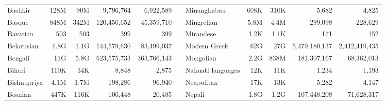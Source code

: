 \begin{table*}[t!]
{\begin{tabular}{@{}lrrrrclrrrr@{}}
            Bashkir                   & 128M                     & 90M                       & 9,796,764                & 6,922,589                 &                          & Minangkabau               & 608K                     & 310K                      & 5,682                    & 4,825                     \\
            Basque                    & 848M                     & 342M                      & 120,456,652              & 45,359,710                &                          & Mingrelian                & 5.8M                     & 4.4M                      & 299,098                  & 228,629                   \\
            Bavarian                  & 503                      & 503                       & 399                      & 399                       &                          & Mirandese                 & 1.2K                     & 1.1K                      & 171                      & 152                       \\
            Belarusian                & 1.8G                     & 1.1G                      & 144,579,630              & 83,499,037                &                          & Modern Greek              & 62G                      & 27G                       & 5,479,180,137            & 2,412,419,435             \\
            Bengali                   & 11G                      & 5.8G                      & 623,575,733              & 363,766,143               &                          & Mongolian                 & 2.2G                     & 838M                      & 181,307,167              & 68,362,013                \\
            Bihari                    & 110K                     & 34K                       & 8,848                    & 2,875                     &                          & Nahuatl languages         & 12K                      & 11K                       & 1,234                    & 1,193                     \\
            Bishnupriya               & 4.1M                     & 1.7M                      & 198,286                  & 96,940                    &                          & Neapolitan                & 17K                      & 13K                       & 5,282                    & 4,147                     \\
            Bosnian                   & 447K                     & 116K                      & 106,448                  & 20,485                    &                          & Nepali                    & 1.8G                     & 1.2G                      & 107,448,208              & 71,628,317                \\

\end{tabular}}
\end{table*}

